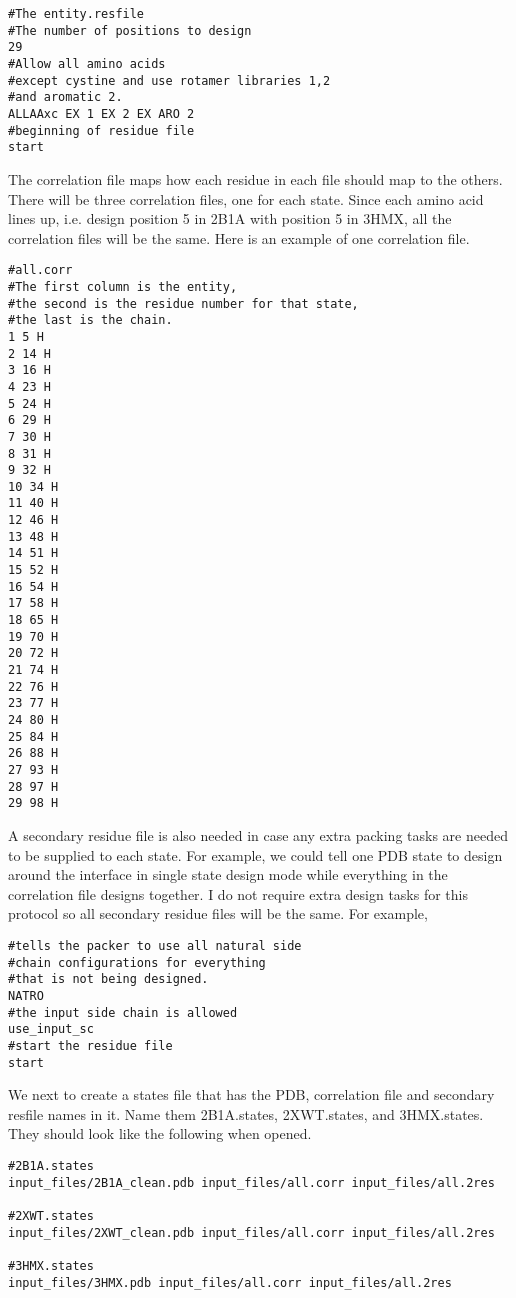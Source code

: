 \begin{lstlisting}
#The entity.resfile
#The number of positions to design
29
#Allow all amino acids
#except cystine and use rotamer libraries 1,2
#and aromatic 2.
ALLAAxc EX 1 EX 2 EX ARO 2
#beginning of residue file
start
\end{lstlisting}

The correlation file maps how each residue in each file should map to the others. There will be three correlation files, one for each state. Since each amino acid lines up, i.e. design position 5 in 2B1A with position 5 in 3HMX, all the correlation files will be the same. Here is an example of one correlation file.

\begin{lstlisting}[breaklines=true]
#all.corr
#The first column is the entity,
#the second is the residue number for that state,
#the last is the chain.
1 5 H
2 14 H
3 16 H
4 23 H
5 24 H
6 29 H
7 30 H
8 31 H
9 32 H
10 34 H
11 40 H
12 46 H
13 48 H
14 51 H
15 52 H
16 54 H
17 58 H
18 65 H
19 70 H
20 72 H
21 74 H
22 76 H
23 77 H
24 80 H
25 84 H
26 88 H
27 93 H
28 97 H
29 98 H
\end{lstlisting}
A secondary residue file is also needed in case any extra packing tasks are needed to be supplied to each state. For example, we could tell one PDB state to design around the interface in single state design mode while everything in the correlation file designs together. I do not require extra design tasks for this protocol so all secondary residue files will be the same. For example,

\begin{lstlisting}[breaklines=true]
#tells the packer to use all natural side
#chain configurations for everything
#that is not being designed.
NATRO
#the input side chain is allowed
use_input_sc
#start the residue file
start
\end{lstlisting}

We next to create a states file that has the PDB, correlation file and secondary resfile names in it. Name them 2B1A.states, 2XWT.states, and 3HMX.states. They should look like the following when opened.

\begin{lstlisting}[breaklines=true]
#2B1A.states
input_files/2B1A_clean.pdb input_files/all.corr input_files/all.2res

#2XWT.states
input_files/2XWT_clean.pdb input_files/all.corr input_files/all.2res

#3HMX.states
input_files/3HMX.pdb input_files/all.corr input_files/all.2res
\end{lstlisting}

